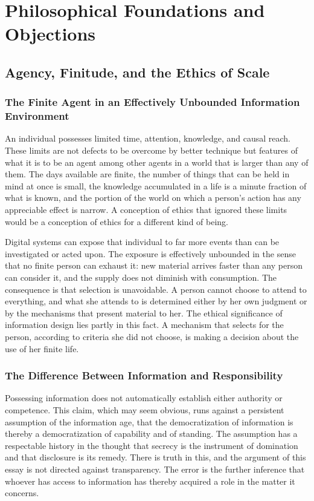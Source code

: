 \documentclass[11pt]{report}
\theoremstyle{definition}
\theoremstyle{remark}
\begin{document}
\part{Philosophical Foundations and Objections}

\chapter{Agency, Finitude, and the Ethics of Scale}

\section{The Finite Agent in an Effectively Unbounded Information Environment}

An individual possesses limited time, attention, knowledge, and causal reach. These limits are not defects to be overcome by better technique but features of what it is to be an agent among other agents in a world that is larger than any of them. The days available are finite, the number of things that can be held in mind at once is small, the knowledge accumulated in a life is a minute fraction of what is known, and the portion of the world on which a person's action has any appreciable effect is narrow. A conception of ethics that ignored these limits would be a conception of ethics for a different kind of being.

Digital systems can expose that individual to far more events than can be investigated or acted upon. The exposure is effectively unbounded in the sense that no finite person can exhaust it: new material arrives faster than any person can consider it, and the supply does not diminish with consumption. The consequence is that selection is unavoidable. A person cannot choose to attend to everything, and what she attends to is determined either by her own judgment or by the mechanisms that present material to her. The ethical significance of information design lies partly in this fact. A mechanism that selects for the person, according to criteria she did not choose, is making a decision about the use of her finite life.

\section{The Difference Between Information and Responsibility}

Possessing information does not automatically establish either authority or competence. This claim, which may seem obvious, runs against a persistent assumption of the information age, that the democratization of information is thereby a democratization of capability and of standing. The assumption has a respectable history in the thought that secrecy is the instrument of domination and that disclosure is its remedy. There is truth in this, and the argument of this essay is not directed against transparency. The error is the further inference that whoever has access to information has thereby acquired a role in the matter it concerns.
\end{document}
